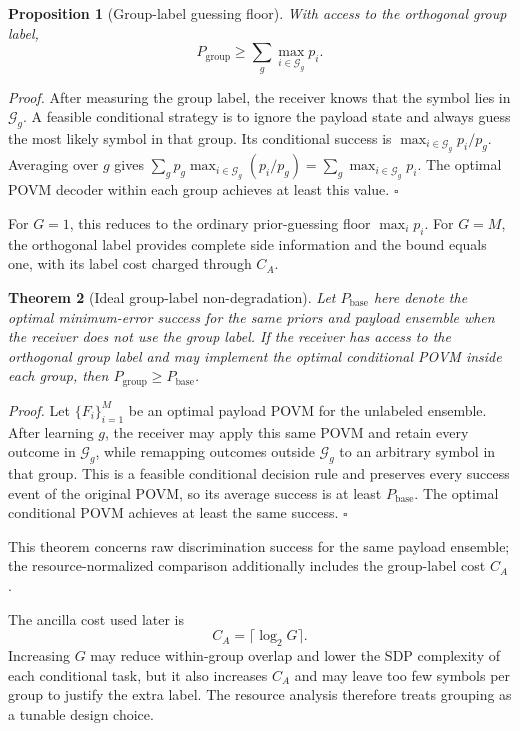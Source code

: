 \documentclass[
 reprint,
 amsmath,amssymb,
 aps,
 pra,
 floatfix,
]{revtex4-2}
\newtheorem{theorem}{Theorem}
\newtheorem{proposition}[theorem]{Proposition}
\begin{document}
\begin{proposition}[Group-label guessing floor]\label{prop:group-guess-floor}
With access to the orthogonal group label,
\begin{equation}
    P_{\mathrm{group}}\ge \sum_g \max_{i\in\mathcal G_g}p_i .
    \label{eq:group_guess_floor}
\end{equation}
\end{proposition}
\textit{Proof.} After measuring the group label, the receiver knows that the symbol lies in $\mathcal G_g$. A feasible conditional strategy is to ignore the payload state and always guess the most likely symbol in that group. Its conditional success is $\max_{i\in\mathcal G_g}p_i/p_g$. Averaging over $g$ gives $\sum_g p_g\max_{i\in\mathcal G_g}(p_i/p_g)=\sum_g\max_{i\in\mathcal G_g}p_i$. The optimal POVM decoder within each group achieves at least this value. \(\square\)

For \(G=1\), this reduces to the ordinary prior-guessing floor \(\max_i p_i\). For \(G=M\), the orthogonal label provides complete side information and the bound equals one, with its label cost charged through \(C_A\).

\begin{theorem}[Ideal group-label non-degradation]\label{thm:group-nondegradation}
Let \(P_{\mathrm{base}}\) here denote the optimal minimum-error success for the same priors and payload ensemble when the receiver does not use the group label. If the receiver has access to the orthogonal group label and may implement the optimal conditional POVM inside each group, then \(P_{\mathrm{group}}\geq P_{\mathrm{base}}\).
\end{theorem}
\textit{Proof.} Let \(\{F_i\}_{i=1}^M\) be an optimal payload POVM for the unlabeled ensemble. After learning \(g\), the receiver may apply this same POVM and retain every outcome in \(\mathcal G_g\), while remapping outcomes outside \(\mathcal G_g\) to an arbitrary symbol in that group. This is a feasible conditional decision rule and preserves every success event of the original POVM, so its average success is at least \(P_{\mathrm{base}}\). The optimal conditional POVM achieves at least the same success. \(\square\)

This theorem concerns raw discrimination success for the same payload ensemble; the resource-normalized comparison additionally includes the group-label cost \(C_A\).

The ancilla cost used later is
\begin{equation}
    C_A=\lceil\log_2G\rceil .
    \label{eq:ancilla_cost}
\end{equation}
Increasing $G$ may reduce within-group overlap and lower the SDP complexity of each conditional task, but it also increases $C_A$ and may leave too few symbols per group to justify the extra label. The resource analysis therefore treats grouping as a tunable design choice.
\end{document}
